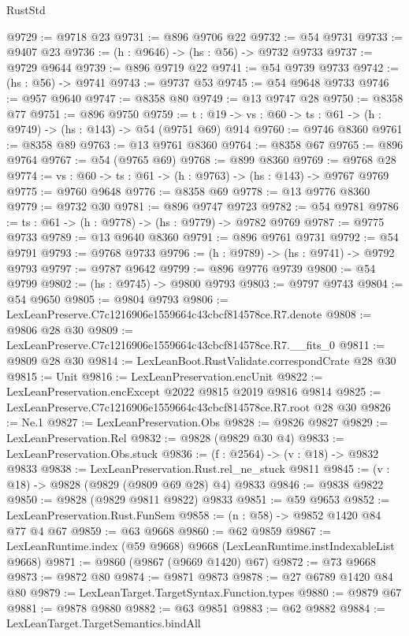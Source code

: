 \begin{lexlean}{RustStd}
\begin{coremodule}
@9729 := @9718 @23
@9731 := @896 @9706 @22
@9732 := @54 @9731
@9733 := @9407 @23
@9736 := (h : @9646) -> (hs : @56) -> @9732 @9733
@9737 := @9729 @9644
@9739 := @896 @9719 @22
@9741 := @54 @9739 @9733
@9742 := (hs : @56) -> @9741
@9743 := @9737 @53
@9745 := @54 @9648 @9733
@9746 := @957 @9640
@9747 := @8358 @80
@9749 := @13 @9747 @28
@9750 := @8358 @77
@9751 := @896 @9750
@9759 := {t : @19} -> {vs : @60} -> {ts : @61} -> (h : @9749) -> (hs : @143) -> @54 (@9751 @69) @914
@9760 := @9746 @8360
@9761 := @8358 @89
@9763 := @13 @9761 @8360
@9764 := @8358 @67
@9765 := @896 @9764
@9767 := @54 (@9765 @69)
@9768 := @899 @8360
@9769 := @9768 @28
@9774 := {vs : @60} -> {ts : @61} -> (h : @9763) -> (hs : @143) -> @9767 @9769
@9775 := @9760 @9648
@9776 := @8358 @69
@9778 := @13 @9776 @8360
@9779 := @9732 @30
@9781 := @896 @9747 @9723
@9782 := @54 @9781
@9786 := {ts : @61} -> (h : @9778) -> (hs : @9779) -> @9782 @9769
@9787 := @9775 @9733
@9789 := @13 @9640 @8360
@9791 := @896 @9761 @9731
@9792 := @54 @9791
@9793 := @9768 @9733
@9796 := (h : @9789) -> (hs : @9741) -> @9792 @9793
@9797 := @9787 @9642
@9799 := @896 @9776 @9739
@9800 := @54 @9799
@9802 := (hs : @9745) -> @9800 @9793
@9803 := @9797 @9743
@9804 := @54 @9650
@9805 := @9804 @9793
@9806 := LexLeanPreserve.C7c1216906e1559664c43cbcf814578ce.R7.denote
@9808 := @9806 @28 @30
@9809 := LexLeanPreserve.C7c1216906e1559664c43cbcf814578ce.R7.__fits_0
@9811 := @9809 @28 @30
@9814 := LexLeanBoot.RustValidate.correspondCrate @28 @30
@9815 := Unit
@9816 := LexLeanPreservation.encUnit
@9822 := LexLeanPreservation.encExcept @2022 @9815 @2019 @9816 @9814
@9825 := LexLeanPreserve.C7c1216906e1559664c43cbcf814578ce.R7.root @28 @30
@9826 := Ne.{1}
@9827 := LexLeanPreservation.Obs
@9828 := @9826 @9827
@9829 := LexLeanPreservation.Rel
@9832 := @9828 (@9829 @30 @4)
@9833 := LexLeanPreservation.Obs.stuck
@9836 := (f : @2564) -> (v : @18) -> @9832 @9833
@9838 := LexLeanPreservation.Rust.rel_ne_stuck @9811
@9845 := (v : @18) -> @9828 (@9829 (@9809 @69 @28) @4) @9833
@9846 := @9838 @9822
@9850 := @9828 (@9829 @9811 @9822) @9833
@9851 := @59 @9653
@9852 := LexLeanPreservation.Rust.FunSem
@9858 := (n : @58) -> @9852 @1420 @84 @77 @4 @67
@9859 := @63 @9668
@9860 := @62 @9859
@9867 := LexLeanRuntime.index (@59 @9668) @9668 (LexLeanRuntime.instIndexableList @9668)
@9871 := @9860 (@9867 (@9669 @1420) @67)
@9872 := @73 @9668
@9873 := @9872 @80
@9874 := @9871 @9873
@9878 := @27 @6789 @1420 @84 @80
@9879 := LexLeanTarget.TargetSyntax.Function.types
@9880 := @9879 @67
@9881 := @9878 @9880
@9882 := @63 @9851
@9883 := @62 @9882
@9884 := LexLeanTarget.TargetSemantics.bindAll

\end{coremodule}
\end{lexlean}
